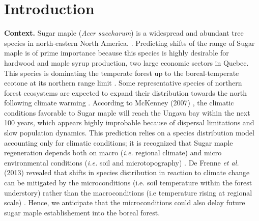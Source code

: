 


\newpage
\setcounter{page}{1}

\section{Introduction}

\textbf{Context.} Sugar maple (\textit{Acer saccharum}) is a widespread and
abundant tree species in north-eastern North America.
\cite{Graignic2013,Messaoud2007,Kellman2004,Barras1998}. Predicting shifts of
the range of Sugar maple is of prime importance because this species is highly
desirable for hardwood and maple syrup production, two large economic sectors
in Quebec. This species is dominating the temperate forest up to the boreal-temperate  
ecotone at its northern range limit \cite{Barras1998}. Some
representative species of northern forest ecosystems are expected to expand
their distribution towards the north following climate warming
\cite{Sciences2014,Iverson2002}. According to McKenney (2007)
\cite{Sciences2014}, the climatic conditions  favorable to Sugar maple  will
reach the Ungava bay within the next 100 years, which appears highly
improbable because of dispersal limitations and slow population dynamics. This
prediction relies on a species distribution model accounting only for climatic
conditions; it is recognized that Sugar maple regeneration depends both on
macro  (\textit{i.e.} regional climate) and micro environmental conditions
(\textit{i.e.} soil and microtopography) \cite{Graignic2013,Lafleur2010}. De
Frenne \textit{et al.} (2013) revealed that shifts in species distribution in
reaction to climate change can be mitigated by the microconditions (i.e. soil
temperature within the forest understory) rather than the macroconditions (i.e
temperature rising at regional scale) \cite{DeFrenne2013}. Hence, we anticipate that the
microconditions could also delay future sugar maple establishement into the
boreal forest.\\



